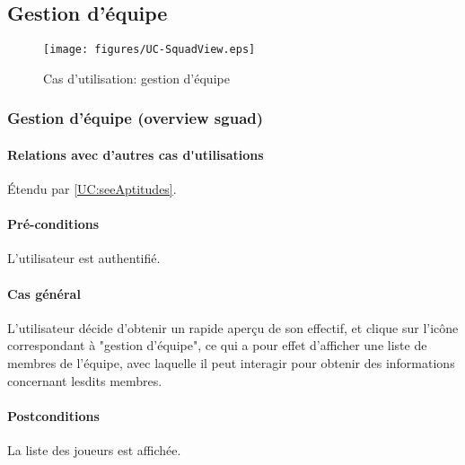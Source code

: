 

\subsection{Gestion d'équipe}

\begin{figure}[h]
  \centering
  \texttt{[image: figures/UC-SquadView.eps]}
  \caption{\label{fig:UC:SquadView} Cas d'utilisation: gestion d'équipe}
\end{figure}

\subsubsection{Gestion d'équipe (overview sguad)}
\label{UC:squadView}
\paragraph{Relations avec d'autres \gls{cas d'utilisation}s}
Étendu par \ref{UC:seeAptitudes}.
\paragraph{Pré-conditions}
\begin{list}{}{\leftmargin=1.5em}
\item{L'\gls{utilisateur} est authentifié.}
\end{list}
\paragraph{Cas général}
L'utilisateur décide d'obtenir un rapide aperçu de son effectif, et clique sur l'icône correspondant à "gestion d'équipe", ce qui a pour effet d'afficher une liste de membres de l'équipe, avec laquelle il peut interagir pour obtenir des informations concernant lesdits membres.
\paragraph{Postconditions} La liste des joueurs est affichée.

